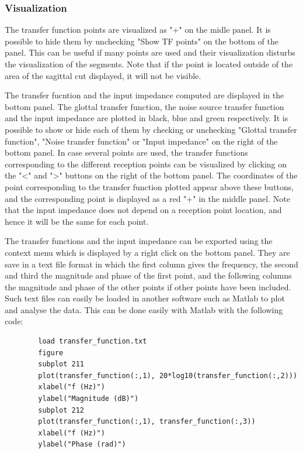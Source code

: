 \documentclass[]{article}
\begin{document}
	\subsubsection{Visualization}
	
	The transfer function points are visualized as "+" on the midle panel.
	It is possible to hide them by unchecking "Show TF points" on the bottom of 
	the panel. This can be useful if many points are used and their visualization 
	disturbs the visualization of the segments.
	Note that if the point is located outside of the area of the sagittal cut displayed,
	it will not be visible.
	
	The transfer fucntion and the input impedance computed are displayed in the bottom panel.
	The glottal transfer function, the noise source transfer function and the input 
	impedance are plotted in black, blue and green respectively.
	It is possible to show or hide each of them by checking or unchecking 
	"Glottal transfer function", "Noise transfer function" or "Input impedance" on the 
	right of the bottom panel. 
	In case several points are used, 
	the transfer functions corresponding to the different reception points can be visualized
	by clicking on the "<" and ">" buttons on the right of the bottom panel.
	The coordinates of the point corresponding to the transfer function plotted appear above 
	these buttons, and the corresponding point is displayed as a red "+" in the middle panel.
	Note that the input impedance does not depend on a reception point location, and hence
	it will be the same for each point.
	
	The transfer functions and the input impedance can be exported using the context 
	menu which is displayed by a right click on the bottom panel. 
	They are save in a text file format in which the first column gives the frequency, 
	the second and third the magnitude and phase of the first point, and the following 
	columns the magnitude and phase of the other points if other points have been included.
	Such text files can easily be loaded in another software such as Matlab to plot and 
	analyse the data.
	This can be done easily with Matlab with the following code:
	\begin{lstlisting}
		load transfer_function.txt
		figure
		subplot 211
		plot(transfer_function(:,1), 20*log10(transfer_function(:,2)))
		xlabel("f (Hz)")
		ylabel("Magnitude (dB)")
		subplot 212
		plot(transfer_function(:,1), transfer_function(:,3))
		xlabel("f (Hz)")
		ylabel("Phase (rad)")
	\end{lstlisting}
	
\end{document}
